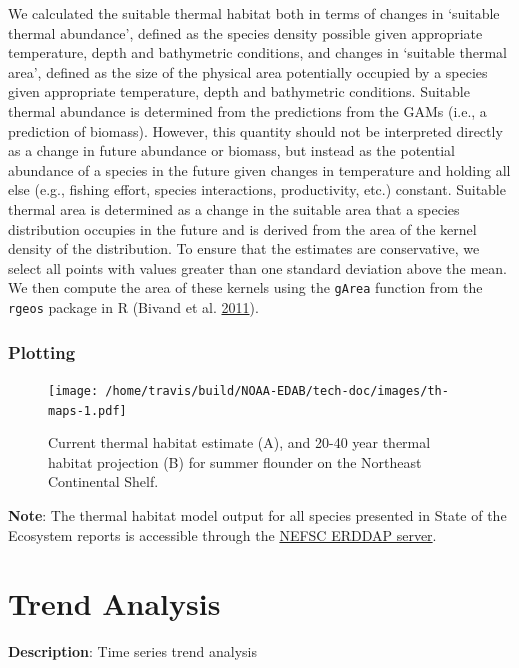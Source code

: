 \documentclass[
]{book}
\begin{document}
We calculated the suitable thermal habitat both in terms of changes in `suitable thermal abundance', defined as the species density possible given appropriate temperature, depth and bathymetric conditions, and changes in `suitable thermal area', defined as the size of the physical area potentially occupied by a species given appropriate temperature, depth and bathymetric conditions. Suitable thermal abundance is determined from the predictions from the GAMs (i.e., a prediction of biomass). However, this quantity should not be interpreted directly as a change in future abundance or biomass, but instead as the potential abundance of a species in the future given changes in temperature and holding all else (e.g., fishing effort, species interactions, productivity, etc.) constant. Suitable thermal area is determined as a change in the suitable area that a species distribution occupies in the future and is derived from the area of the kernel density of the distribution. To ensure that the estimates are conservative, we select all points with values greater than one standard deviation above the mean. We then compute the area of these kernels using the \texttt{gArea} function from the \texttt{rgeos} package in R (Bivand et al. \protect\hyperlink{ref-Bivand2011}{2011}).

\hypertarget{plotting-34}{%
\subsection{Plotting}\label{plotting-34}}

\begin{figure}
\centering
\texttt{[image: /home/travis/build/NOAA-EDAB/tech-doc/images/th-maps-1.pdf]}
\caption{\label{fig:th-maps}Current thermal habitat estimate (A), and 20-40 year thermal habitat projection (B) for summer flounder on the Northeast Continental Shelf.}
\end{figure}

\textbf{Note}: The thermal habitat model output for all species presented in State of the Ecosystem reports is accessible through the \href{https://comet.nefsc.noaa.gov/erddap/info/index.html?page=1\&itemsPerPage=1000}{NEFSC ERDDAP server}.

\hypertarget{trend-analysis}{%
\chapter{Trend Analysis}\label{trend-analysis}}

\textbf{Description}: Time series trend analysis
\end{document}
